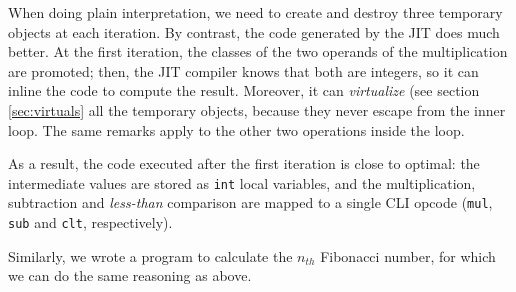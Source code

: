 
When doing plain interpretation, we need to create and destroy three temporary
objects at each iteration.  By contrast, the code generated by the JIT does
much better.  At the first iteration, the classes of the two operands of the
multiplication are promoted; then, the JIT compiler knows that both are
integers, so it can inline the code to compute the result.  Moreover, it can
\emph{virtualize} (see section \ref{sec:virtuals} all the temporary objects, because they never escape from
the inner loop.  The same remarks apply to the other two operations inside
the loop.

As a result, the code executed after the first iteration is close to optimal:
the intermediate values are stored as \lstinline{int} local variables, and the
multiplication, subtraction and \emph{less-than} comparison are mapped to a
single CLI opcode (\lstinline{mul}, \lstinline{sub} and \lstinline{clt},
respectively).

Similarly, we wrote a program to calculate the $n_{th}$ Fibonacci number, for
which we can do the same reasoning as above.


